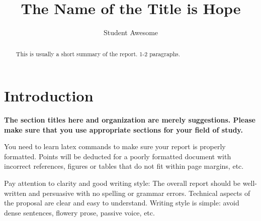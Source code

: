 \documentclass{stylefiles/capstone}
\begin{document}
\title{The Name of the Title is Hope}


\author{Student Awesome}




\renewcommand{\shortauthors}{Awesome}

\begin{abstract}
  This is usually a short summary of the report. 1-2 paragraphs.
\end{abstract}





\maketitle

\section{Introduction}

\textbf{The section titles here and organization are merely suggestions. Please make sure that you use appropriate sections for your field of study.}

You need to learn latex commands to make sure your report is properly formatted. Points will be deducted for a poorly formatted document with incorrect references, figures or tables that do not fit within page margins, etc.

Pay attention to clarity and good writing style: The overall report should be well-written and persuasive with no spelling or grammar errors. Technical aspects of the proposal are clear and easy to understand. Writing style is simple: avoid dense sentences, flowery prose, passive voice, etc.
\end{document}
